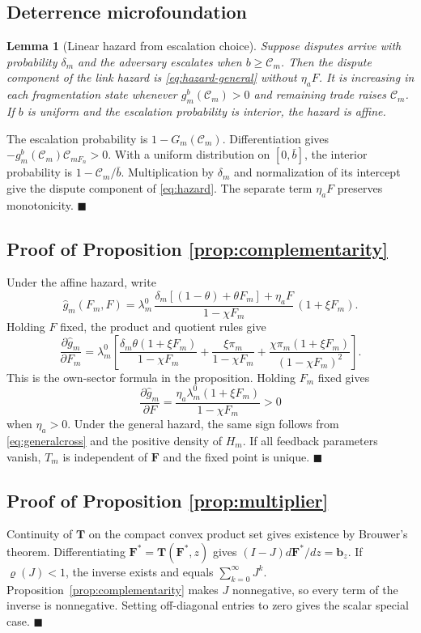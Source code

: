 \documentclass[11pt]{article}
\newtheorem{lemma}{Lemma}
\theoremstyle{definition}
\begin{document}
\subsection{Deterrence microfoundation}\label{app:microproof}
\begin{lemma}[Linear hazard from escalation choice]\label{lem:deterrence}
Suppose disputes arrive with probability $\delta_m$ and the adversary escalates when $b\geq\mathcal C_m$. Then the dispute component of the link hazard is \eqref{eq:hazard-general} without $\eta_aF$. It is increasing in each fragmentation state whenever $g_m^b(\mathcal C_m)>0$ and remaining trade raises $\mathcal C_m$. If $b$ is uniform and the escalation probability is interior, the hazard is affine.
\end{lemma}
\noindent The escalation probability is $1-G_m(\mathcal C_m)$. Differentiation gives $-g_m^b(\mathcal C_m)\mathcal C_{mF_n}>0$. With a uniform distribution on $[0,\bar b]$, the interior probability is $1-\mathcal C_m/\bar b$. Multiplication by $\delta_m$ and normalization of its intercept give the dispute component of \eqref{eq:hazard}. The separate term $\eta_aF$ preserves monotonicity. $\blacksquare$

\subsection{Proof of Proposition \ref{prop:complementarity}}
Under the affine hazard, write
\[
\hat g_m(F_m,F)=\lambda_m^0\,\frac{\delta_m[(1-\theta)+\theta F_m]+\eta_aF}{1-\chi F_m}\,(1+\xi F_m).
\]
Holding $F$ fixed, the product and quotient rules give
\[
\frac{\partial \hat g_m}{\partial F_m}
= \lambda^0_m\left[
\frac{\delta_m\theta(1+\xi F_m)}{1-\chi F_m}
+ \frac{\xi\pi_m}{1-\chi F_m}
+ \frac{\chi\pi_m(1+\xi F_m)}{(1-\chi F_m)^2}
\right].
\]
This is the own-sector formula in the proposition. Holding $F_m$ fixed gives
\[
\frac{\partial \hat g_m}{\partial F}
=\frac{\eta_a\lambda^0_m(1+\xi F_m)}{1-\chi F_m}>0
\]
when $\eta_a>0$. Under the general hazard, the same sign follows from \eqref{eq:generalcross} and the positive density of $H_m$. If all feedback parameters vanish, $T_m$ is independent of $\mathbf F$ and the fixed point is unique. $\blacksquare$

\subsection{Proof of Proposition \ref{prop:multiplier}}
Continuity of $\mathbf T$ on the compact convex product set gives existence by Brouwer's theorem. Differentiating $\mathbf F^*=\mathbf T(\mathbf F^*,z)$ gives $(I-J)d\mathbf F^*/dz=\mathbf b_z$. If $\varrho(J)<1$, the inverse exists and equals $\sum_{k=0}^{\infty}J^k$. Proposition~\ref{prop:complementarity} makes $J$ nonnegative, so every term of the inverse is nonnegative. Setting off-diagonal entries to zero gives the scalar special case. $\blacksquare$
\end{document}

